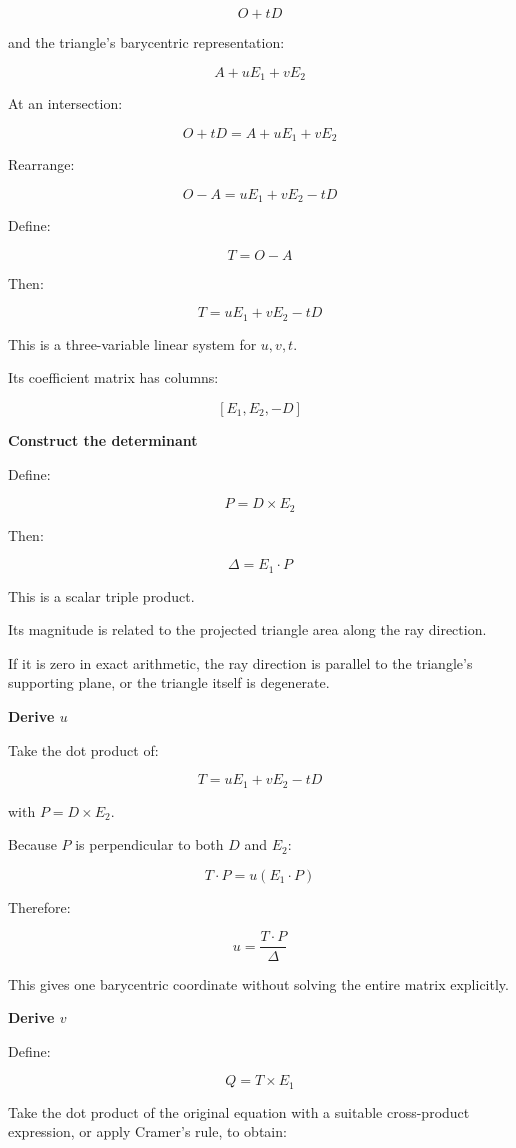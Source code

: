 \[
O+tD
\]

and the triangle's barycentric representation:

\[
A+uE_1+vE_2
\]

At an intersection:

\[
O+tD=A+uE_1+vE_2
\]

Rearrange:

\[
O-A=uE_1+vE_2-tD
\]

Define:

\[
T=O-A
\]

Then:

\[
\boxed{ T=uE_1+vE_2-tD }
\]

This is a three-variable linear system for \(u,v,t\).

Its coefficient matrix has columns:

\[
[E_1,E_2,-D]
\]

\textbf{Construct the determinant}

Define:

\[
\boxed{ P=D\times E_2 }
\]

Then:

\[
\boxed{ \Delta=E_1\cdot P }
\]

This is a scalar triple product.

Its magnitude is related to the projected triangle area along the ray direction.

If it is zero in exact arithmetic, the ray direction is parallel to the triangle's supporting plane, or the triangle itself is degenerate.

\textbf{Derive \(u\)}

Take the dot product of:

\[
T=uE_1+vE_2-tD
\]

with \(P=D\times E_2\).

Because \(P\) is perpendicular to both \(D\) and \(E_2\):

\[
T\cdot P=u(E_1\cdot P)
\]

Therefore:

\[
\boxed{ u=\frac{T\cdot P}{\Delta} }
\]

This gives one barycentric coordinate without solving the entire matrix explicitly.

\textbf{Derive \(v\)}

Define:

\[
\boxed{ Q=T\times E_1 }
\]

Take the dot product of the original equation with a suitable cross-product expression, or apply Cramer's rule, to obtain:

